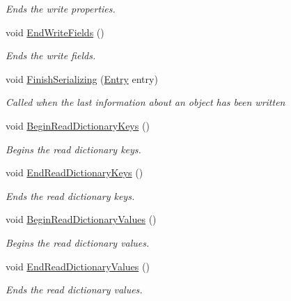 \begin{DoxyCompactItemize}
\begin{DoxyCompactList}\small\item\em Ends the write properties. \end{DoxyCompactList}\item 
void \hyperlink{class_serialization_1_1_binary_serializer_a09fa1076cad8e42856d57a62d693c4cf}{End\+Write\+Fields} ()
\begin{DoxyCompactList}\small\item\em Ends the write fields. \end{DoxyCompactList}\item 
void \hyperlink{class_serialization_1_1_binary_serializer_a026959038d36c07fc77d6da1345ab4d2}{Finish\+Serializing} (\hyperlink{class_serialization_1_1_entry}{Entry} entry)
\begin{DoxyCompactList}\small\item\em Called when the last information about an object has been written \end{DoxyCompactList}\item 
void \hyperlink{class_serialization_1_1_binary_serializer_aa91a1c6b09260e35b8342d1254e15d3c}{Begin\+Read\+Dictionary\+Keys} ()
\begin{DoxyCompactList}\small\item\em Begins the read dictionary keys. \end{DoxyCompactList}\item 
void \hyperlink{class_serialization_1_1_binary_serializer_ab8d362901844c2b1aa7420269f72fa50}{End\+Read\+Dictionary\+Keys} ()
\begin{DoxyCompactList}\small\item\em Ends the read dictionary keys. \end{DoxyCompactList}\item 
void \hyperlink{class_serialization_1_1_binary_serializer_ade68463fa1bf913dd9f768b4edfed5bc}{Begin\+Read\+Dictionary\+Values} ()
\begin{DoxyCompactList}\small\item\em Begins the read dictionary values. \end{DoxyCompactList}\item 
void \hyperlink{class_serialization_1_1_binary_serializer_a37b4e1255ab937e041a3c8d0786b461c}{End\+Read\+Dictionary\+Values} ()
\begin{DoxyCompactList}\small\item\em Ends the read dictionary values. \end{DoxyCompactList}\item 

\end{DoxyCompactItemize}
